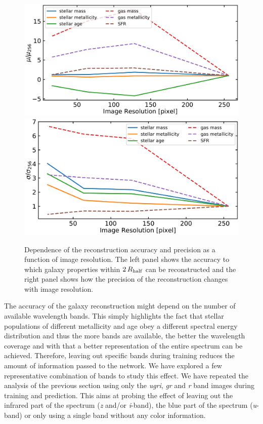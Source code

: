 \documentclass[conference]{IEEEtran}
\begin{document}
\begin{figure}
\begin{center}
\includegraphics[width=.5\textwidth]{./plots/res_comparison_mu.pdf}
\includegraphics[width=.4875\textwidth]{./plots/res_comparison_sigma.pdf}
\end{center}
\vspace{-.35cm}
\caption{Dependence of the reconstruction accuracy and precision as a function of image resolution. The left panel shows the accuracy to which galaxy properties within $2\,R_{\rm half}$ can be reconstructed and the right panel shows how the precision of the reconstruction changes with image resolution.}
\label{fig:res_comp}
\end{figure}

The accuracy of the galaxy reconstruction might depend on the number of available wavelength bands. This simply highlights the fact that stellar populations of different metallicity and age obey a different spectral energy distribution and thus the more bands are available, the better the wavelength coverage and with that a better representation of the entire spectrum can be achieved. Therefore, leaving out specific bands during training reduces the amount of information passed to the network. We have explored a few representative combination of bands to study this effect. We have repeated the analysis of the previous section using only the \emph{ugri}, \emph{gr} and \emph{r} band images during training and prediction. This aims at probing the effect of leaving out the infrared part of the spectrum (\emph{z} and/or \emph{i}-band), the blue part of the spectrum (\emph{u}-band) or only using a single band without any color information. 
\end{document}
